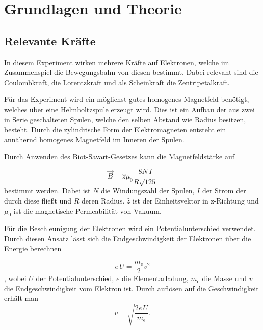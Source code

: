 \section{Grundlagen und Theorie}
\subsection{Relevante Kräfte}
In diesem Experiment wirken mehrere Kräfte auf Elektronen, welche im Zusammenspiel die Bewegungsbahn von diesen bestimmt. Dabei relevant sind die Coulombkraft, die Lorentzkraft und als Scheinkraft die Zentripetalkraft.

Für das Experiment wird ein möglichst gutes homogenes Magnetfeld benötigt, welches über eine Helmholtzspule erzeugt wird. Dies ist ein Aufbau der aus zwei in Serie geschalteten Spulen, welche den selben Abstand wie Radius besitzen, besteht. Durch die zylindrische Form der Elektromagneten entsteht ein annähernd homogenes Magnetfeld im Inneren der Spulen.  

Durch Anwenden des Biot-Savart-Gesetzes kann die Magnetfeldstärke auf 

\begin{equation}\label{eqn:H}
	\vec{B} = \hat{z} \mu_0\frac{8N\,I}{R\sqrt{125}}
\end{equation}
%
bestimmt werden. Dabei ist $N$ die Windungszahl der Spulen, $I$ der Strom der durch diese fließt und \( R \) deren Radius. $\hat{z}$ ist der Einheitsvektor in z-Richtung und $\mu_0$ ist die magnetische Permeabilität von Vakuum. 

Für die Beschleunigung der Elektronen wird ein Potentialunterschied verwendet. Durch diesen Ansatz lässt sich die Endgeschwindigkeit der Elektronen über die Energie berechnen

$$e\,U=\frac{m_{\text{e}}}{2}v^2$$
%
, wobei $U$ der Potentialunterschied, $e$ die Elementarladung, $m_{\text{e}}$ die Masse und $v$ die Endgeschwindigkeit vom Elektron ist. Durch auflösen auf die Geschwindigkeit erhält man
$$v=\sqrt{\frac{2e\,U}{m_{\text{e}}}}.$$


